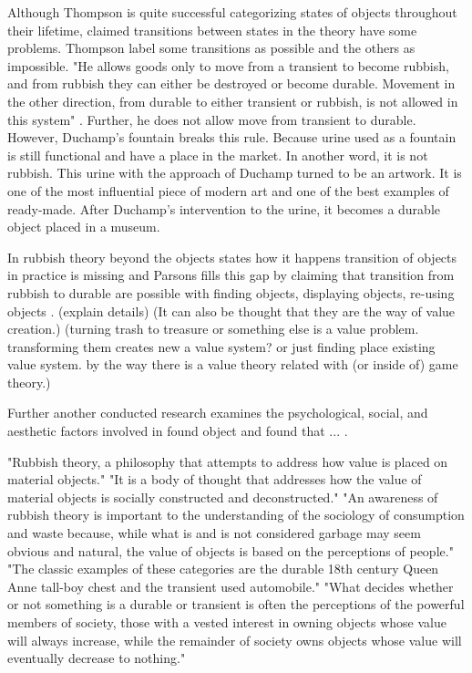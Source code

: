 \documentclass[12pt]{article}
\begin{document}
Although Thompson is quite successful categorizing states of objects throughout their lifetime, claimed transitions between states in the theory have some problems. Thompson label some transitions as possible and the others as impossible. "He allows goods only to move from a transient to become rubbish, and from rubbish they can either be destroyed or become durable. Movement in the other direction, from durable to either transient or rubbish, is not allowed in this system" \cite{meadow2011relocation}. Further, he does not allow move from transient to durable. However, Duchamp's fountain breaks this rule. Because urine used as a fountain is still functional and have a place in the market. In another word, it is not rubbish. This urine with the approach of Duchamp turned to be an artwork. It is one of the most influential piece of modern art and one of the best examples of ready-made. After Duchamp's intervention to the urine, it becomes a durable object placed in a museum.

In rubbish theory beyond the objects states how it happens transition of objects in practice is missing and Parsons fills this gap by claiming that transition from rubbish to durable are possible with finding objects, displaying objects, re-using objects \cite{parsons2008thompsons}. (explain details) (It can also be thought that they are the way of value creation.) (turning trash to treasure or something else is a value problem. transforming them creates new a value system? or just finding place existing value system. by the way there is a value theory related with (or inside of) game theory.)

Further another conducted research examines the psychological, social, and aesthetic factors involved in found object and found that ... \cite{camic2010trashed}.

"Rubbish theory, a philosophy that attempts to address how value is placed on material objects." "It is a body of thought that addresses how the value of material objects is socially constructed and deconstructed." "An awareness of rubbish theory is important to the understanding of the sociology of consumption and waste because, while what is and is not considered garbage may seem obvious and natural, the value of objects is based on the perceptions of people." "The classic examples of these categories are the durable 18th century Queen Anne tall-boy chest and the transient used automobile." "What decides whether or not something is a durable or transient is often the perceptions of the powerful members of society, those with a vested interest in owning objects whose value will always increase, while the remainder of society owns objects whose value will eventually decrease to nothing."
\end{document}
